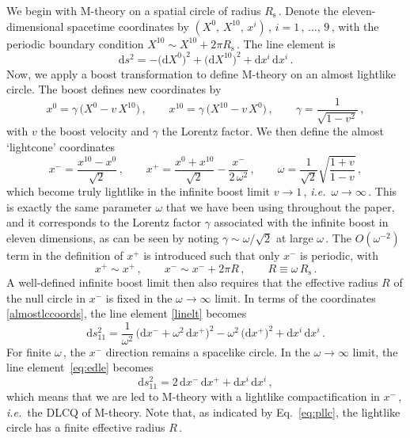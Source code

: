 \documentclass[11pt]{article}
\newcommand{\be}{\begin{equation}}
\newcommand{\ee}{\end{equation}}
\renewcommand{\emph}[1]{\textit{#1}}
\newcommand{\dd}{\mathrm{d}}
\begin{document}
We begin with M-theory on a spatial circle of radius $R_{\text{s}}$\,.
Denote the eleven-dimensional spacetime coordinates by $(X^0, \, X^{10}, \, x^i)$\,, $i=1\,, \, \dots, \, 9$\,, with the periodic boundary condition $X^{10} \sim X^{10} + 2 \pi R_{\text{s}}$\,. The line element is
%
\be
\dd s^2 = - \bigl( \dd X^0 \bigr)^2 + \bigl( \dd X^{10} \bigr)^2 + \dd x^i \, \dd x^i \,.
\label{linelt}
\ee
%
Now, we apply a boost transformation to define M-theory on an almost lightlike circle.
The boost defines new coordinates by
%
\be
    x^0 = \gamma \, \bigl( X^0 - v \, X^{10} \bigr)\,,
        \qquad%
    x^{10} = \gamma \, \bigl( X^{10} - v \, X^0 \bigr)\,,
        \qquad%
    \gamma = \frac{1}{\sqrt{1-v^2}}\,,
\ee
%
with $v$ the boost velocity and $\gamma$ the Lorentz factor. 
We then define the almost `lightcone' coordinates 
%
\be 
    x^- = \frac{x^{10} - x^0}{\sqrt{2}}\,,
        \qquad%
    x^+ = \frac{x^0 + x^{10}}{\sqrt{2}} - \frac{x^-}{2 \, \omega^2}\,, 
        \qquad%
    \omega = \frac{1}{\sqrt{2}} \sqrt{\frac{1 + v}{1 - v}}\,,
\label{almostlccoords}
\ee
%
which become truly lightlike in the infinite boost limit $v \rightarrow 1$\,, \emph{i.e.}~$\omega \rightarrow \infty$\,. 
This is exactly the same parameter $\omega$ that we have been using throughout the paper, and it corresponds to the Lorentz factor $\gamma$ associated with the infinite boost in eleven dimensions, as can be seen by noting $\gamma \sim \omega / \sqrt{2}$ at large $\omega$\,. The $O(\omega^{-2})$ term in the definition of $x^+$ is introduced such that only $x^-$ is periodic, with
%
\be \label{eq:pllc}
    x^+ \sim x^+\,,
        \qquad%
    x^- \sim x^- \!+ 2 \pi R\,,
        \qquad%
   R \equiv \omega \, R_{\text{s}}\,.
\ee
%
A well-defined infinite boost limit then also requires that the effective radius $R$ of the null circle in $x^-$ is fixed in the $\omega \rightarrow \infty$ limit. In terms of the coordinates \eqref{almostlccoords}, the line element \eqref{linelt} becomes
%
\be \label{eq:edle}
    \dd s^2_{11} = \frac{1}{\omega^2} \, \bigl( \dd x^- + \omega^2 \, \dd x^+ \bigr)^{2} - \omega^2 \, \bigl( \dd x^+ \bigr)^2 + \dd x^i \, \dd x^i\,.
\ee
%
For finite $\omega$\,, the $x^-$ direction remains a spacelike circle. In the $\omega \rightarrow \infty$ limit, the line element~\eqref{eq:edle} becomes
%
\be
    \dd s^2_{11} = 2\, \dd x^- \, \dd x^+ + \dd x^i \, \dd x^i\,,
\ee
%
which means that we are led to M-theory with a lightlike compactification in $x^-$\,, \emph{i.e.}~the DLCQ of M-theory. Note that, as indicated by Eq.~\eqref{eq:pllc}, the lightlike circle has a finite effective radius $R$\,. 
\end{document}

